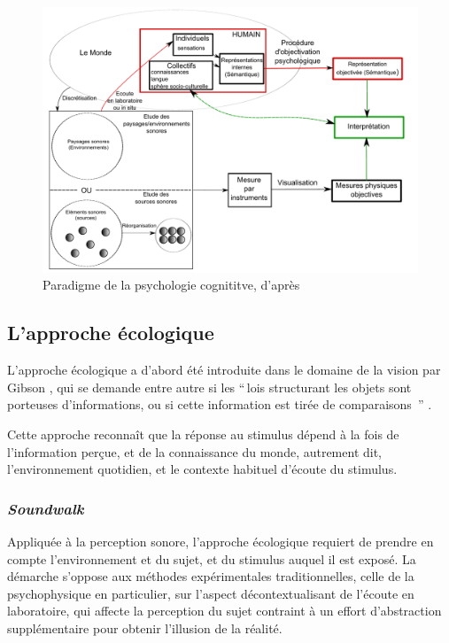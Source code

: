 \begin{figure}[t]
        \myfloatalign
        \includegraphics[width=\linewidth]{gfx/Shema_maffiolo}
        \caption[Paradigme de la psychologie cognititve]{Paradigme de la psychologie cognititve, d'après \citep{maffiolo_caracterisation_1999} }\label{fig:paradigmePsychoCo}
\end{figure}

\subsection{L'approche écologique}
\label{sec:ch3_ecologique}

L'approche écologique a d'abord été introduite dans le domaine de la vision par Gibson \citep{gibson1966senses}, qui se demande entre autre si les ``\,lois structurant les objets sont porteuses d'informations, ou si cette information est tirée de comparaisons \,'' \citep{gibson1978ecological}.

Cette approche reconnaît que la réponse au stimulus dépend à la fois de l'information perçue, et de la connaissance du monde, autrement dit, l'environnement quotidien, et le contexte habituel d'écoute du stimulus.

\subsubsection{\emph{Soundwalk}}

Appliquée à la perception sonore, l'approche écologique requiert de prendre en compte l'environnement et du sujet, et du stimulus auquel il est exposé. La démarche s'oppose aux méthodes expérimentales traditionnelles, celle de la psychophysique en particulier, sur l'aspect décontextualisant de l'écoute en laboratoire, qui affecte la perception du sujet contraint à un effort d'abstraction supplémentaire pour obtenir l'illusion de la réalité.

